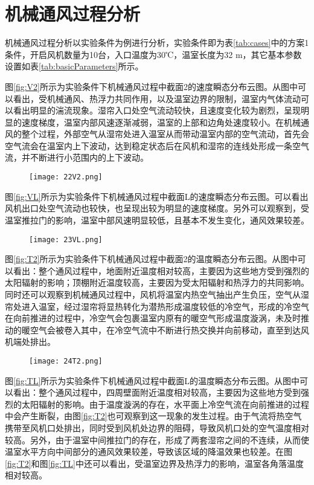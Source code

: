 \section{机械通风过程分析}
机械通风过程分析以实验条件为例进行分析，实验条件即为表\ref{tab:cases}中的方案1条件，开启风机数量为10台，入口温度为30℃，温室长度为32 m，其它基本参数设置如表\ref{tab:basicParameters}所示。

图\ref{fig:V2}所示为实验条件下机械通风过程中截面2的速度瞬态分布云图。从图中可以看出，受机械通风、热浮力共同作用，以及温室边界的限制，温室内气体流动可以看出明显的湍流现象。湿帘入口处空气流动较快，且速度变化较为剧烈，呈现明显的速度梯度，温室内部风速逐渐减弱，温室的上部和边角处速度较小。在机械通风的整个过程，外部空气从湿帘处进入温室从而带动温室内部的空气流动，首先会空气流会在温室内上下波动，达到稳定状态后在风机和湿帘的连线处形成一条空气流，并不断进行小范围内的上下波动。

	\begin{figure}[!htbp]
		\centering
		\texttt{[image: 22V2.png]}
	\end{figure}
图\ref{fig:VL}所示为实验条件下机械通风过程中截面L的速度瞬态分布云图。可以看出风机出口处空气流动也较快，也呈现出较为明显的速度梯度。另外可以观察到，受温室推拉门的影响，温室中部风速明显较低，且基本不发生变化，通风效果较差。

	\begin{figure}[!htbp]
		\centering
		\texttt{[image: 23VL.png]}
	\end{figure}
图\ref{fig:T2}所示为实验条件下机械通风过程中截面2的温度瞬态分布云图。从图中可以看出：整个通风过程中，地面附近温度相对较高，主要因为这些地方受到强烈的太阳辐射的影响；顶棚附近温度较高，主要因为受太阳辐射和热浮力的共同影响。同时还可以观察到机械通风过程中，风机将温室内热空气抽出产生负压，空气从湿帘处进入温室，经过湿帘将显热转化为潜热形成温度较低的冷空气，形成的冷空气在向前推进的过程中，冷空气会包裹温室内原有的暖空气形成温度漩涡，未及时推动的暖空气会被卷入其中，在冷空气流中不断进行热交换并向前移动，直至到达风机端处排出。

	\begin{figure}[!htbp]
		\centering
		\texttt{[image: 24T2.png]}
	\end{figure}
图\ref{fig:TL}所示为实验条件下机械通风过程中截面L的温度瞬态分布云图。从图中可以看出：整个通风过程中，四周壁面附近温度相对较高，主要因为这些地方受到强烈的太阳辐射的影响。由于温度漩涡的存在，水平面上冷空气流在向前推进的过程中会产生断裂，由图\ref{fig:T2}也可观察到这一现象的发生过程。由于气流将热空气携带至风机口处排出，同时受到风机处边界的阻碍，导致风机口处的空气温度相对较高。另外，由于温室中间推拉门的存在，形成了两套湿帘之间的不连续，从而使温室水平方向中间部分的通风效果较差，导致该区域的降温效果也较差。在图\ref{fig:T2}和图\ref{fig:TL}中还可以看出，受温室边界及热浮力的影响，温室各角落温度相对较高。

